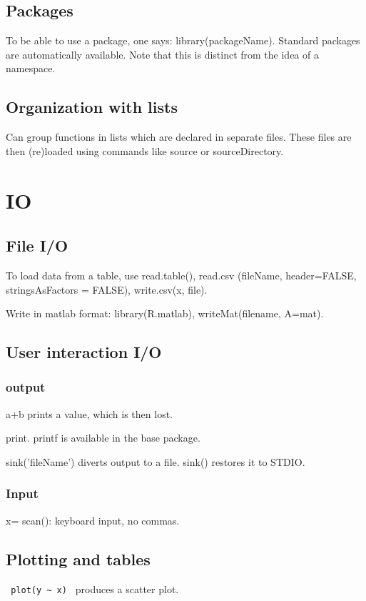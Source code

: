 \documentclass[oneside, article]{memoir}
\begin{document}
\subsection{Packages}
To be able to use a package, one says: library(packageName). Standard packages are automatically available. Note that this is distinct from the idea of a namespace.

\subsection{Organization with lists}
Can group functions in lists which are declared in separate files. These files are then (re)loaded using commands like source or sourceDirectory.

\section{IO}
\subsection{File I/O}
To load data from a table, use read.table(), read.csv (fileName, header=FALSE, stringsAsFactors = FALSE), write.csv(x, file).

Write in matlab format: library(R.matlab), writeMat(filename, A=mat).

\subsection{User interaction I/O}
\subsubsection{output}
a+b prints a value, which is then lost.

print. printf is available in the base package.

sink('fileName') diverts output to a file. sink() restores it to STDIO.

\subsubsection{Input}
x= scan(): keyboard input, no commas.

\subsection{Plotting and tables}
\verb' plot(y ~ x) ' produces a scatter plot.
\end{document}
